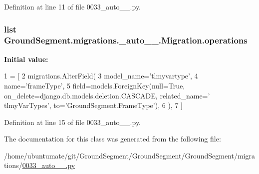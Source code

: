 Definition at line 11 of file 0033\+\_\+auto\+\_\+\_.\+py.

\hypertarget{class_ground_segment_1_1migrations_1_10033__auto__20170130__1316_1_1_migration_a1f99d9fbbb3d0ee996a917fe1630c57e}{}
\subsubsection[{operations}]{\setlength{\rightskip}{0pt plus 5cm}list Ground\+Segment.\+migrations.\+\_\+auto\+\_\+\_.\+Migration.\+operations\hspace{0.3cm}{\ttfamily [static]}}\label{class_ground_segment_1_1migrations_1_10033__auto__20170130__1316_1_1_migration_a1f99d9fbbb3d0ee996a917fe1630c57e}
{\bfseries Initial value\+:}
\begin{DoxyCode}
1 = [
2         migrations.AlterField(
3             model\_name=\textcolor{stringliteral}{'tlmyvartype'},
4             name=\textcolor{stringliteral}{'frameType'},
5             field=models.ForeignKey(null=\textcolor{keyword}{True}, on\_delete=django.db.models.deletion.CASCADE, related\_name=\textcolor{stringliteral}{'
      tlmyVarTypes'}, to=\textcolor{stringliteral}{'GroundSegment.FrameType'}),
6         ),
7     ]
\end{DoxyCode}


Definition at line 15 of file 0033\+\_\+auto\+\_\+\_.\+py.



The documentation for this class was generated from the following file\+:\begin{DoxyCompactItemize}
\item 
/home/ubuntumate/git/\+Ground\+Segment/\+Ground\+Segment/\+Ground\+Segment/migrations/\hyperlink{0033__auto__20170130__1316_8py}{0033\+\_\+auto\+\_\+\_.\+py}\end{DoxyCompactItemize}
